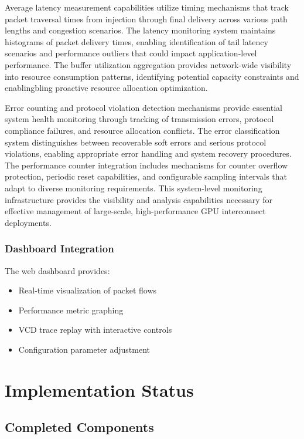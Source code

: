 \documentclass[12pt,letterpaper]{article}
\begin{document}
Average latency measurement capabilities utilize timing mechanisms that track packet traversal times from injection through final delivery across various path lengths and congestion scenarios. The latency monitoring system maintains histograms of packet delivery times, enabling identification of tail latency scenarios and performance outliers that could impact application-level performance. The buffer utilization aggregation provides network-wide visibility into resource consumption patterns, identifying potential capacity constraints and enablingbling proactive resource allocation optimization.

Error counting and protocol violation detection mechanisms provide essential system health monitoring through tracking of transmission errors, protocol compliance failures, and resource allocation conflicts. The error classification system distinguishes between recoverable soft errors and serious protocol violations, enabling appropriate error handling and system recovery procedures. The performance counter integration includes mechanisms for counter overflow protection, periodic reset capabilities, and configurable sampling intervals that adapt to diverse monitoring requirements. This system-level monitoring infrastructure provides the visibility and analysis capabilities necessary for effective management of large-scale, high-performance GPU interconnect deployments.

\subsubsection{Dashboard Integration}

The web dashboard provides:

\begin{itemize}
    \item Real-time visualization of packet flows
    \item Performance metric graphing
    \item VCD trace replay with interactive controls
    \item Configuration parameter adjustment
\end{itemize}

\section{Implementation Status}

\subsection{Completed Components}
\end{document}
